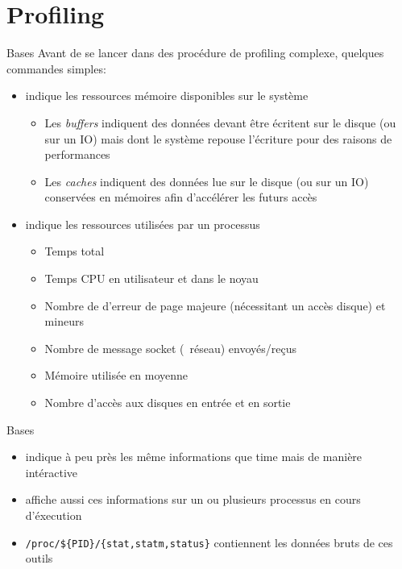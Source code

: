 \section{Profiling}

\begin{frame}[fragile=singleslide]{Bases}
  Avant  de  se  lancer  dans  des procédure  de  profiling  complexe,
  quelques commandes simples:
  \begin{itemize} 
  \item {}  indique les ressources mémoire  disponibles sur le
    système
    \begin{itemize}
    \item  Les  \emph{buffers}   indiquent  des  données  devant  être
      écritent  sur le  disque (ou  sur un  IO) mais  dont  le système
      repouse l'écriture pour des raisons de performances
    \item Les  \emph{caches} indiquent des  données lue sur  le disque
      (ou  sur un  IO)  conservées en  mémoires  afin d'accélérer  les
      futurs accès
    \end{itemize}
  \item {} indique les ressources utilisées par un processus
    \begin{itemize}
    \item Temps total
    \item Temps CPU en utilisateur et dans le noyau
    \item  Nombre de d'erreur  de page  majeure (nécessitant  un accès
      disque) et mineurs
    \item Nombre de message socket (~réseau) envoyés/reçus
    \item Mémoire utilisée en moyenne
    \item Nombre d'accès aux disques en entrée et en sortie
    \end{itemize} 
  \end{itemize}
\end{frame}

\begin{frame}[fragile=singleslide]{Bases}
  \begin{itemize} 
  \item {}  indique à peu  près les même informations  que time
    mais de manière intéractive
  \item {}  affiche aussi ces  informations sur un  ou plusieurs
    processus en cours d'éxecution
  \item    \verb+/proc/${PID}/{stat,statm,status}+   contiennent   les
    données bruts de ces outils
  \end{itemize}
\end{frame}

